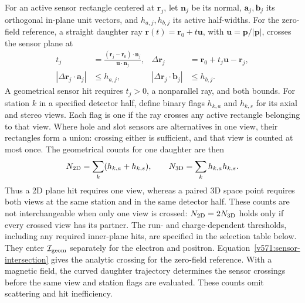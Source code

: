 For an active sensor rectangle centered at $\boldsymbol r_j$, let
$\boldsymbol n_j$ be its normal, $\boldsymbol a_j,\boldsymbol b_j$ its
orthogonal in-plane unit vectors, and $h_{a,j},h_{b,j}$ its active half-widths.
For the zero-field reference, a straight daughter ray
$\boldsymbol r(t)=\boldsymbol r_0+t\boldsymbol u$,
with $\boldsymbol u=\boldsymbol p/|\boldsymbol p|$, crosses the sensor plane at
\begin{align}
  t_j&=\frac{(\boldsymbol r_j-\boldsymbol r_0)\cdot\boldsymbol n_j}
                {\boldsymbol u\cdot\boldsymbol n_j},&
  \Delta\boldsymbol r_j&=\boldsymbol r_0+t_j\boldsymbol u-\boldsymbol r_j,
  \nonumber\\
  |\Delta\boldsymbol r_j\cdot\boldsymbol a_j|&\leq h_{a,j},&
  |\Delta\boldsymbol r_j\cdot\boldsymbol b_j|&\leq h_{b,j}.
  \label{v571:sensor-intersection}
\end{align}
A geometrical sensor hit requires $t_j>0$, a nonparallel ray, and both bounds.
For station $k$ in a specified detector half, define binary flags
$h_{k,a}$ and $h_{k,s}$ for its axial and stereo views.  Each flag is one if
the ray crosses any active rectangle belonging to that view.  Where hole and
slot sensors are alternatives in one view, their rectangles form a union:
crossing either is sufficient, and that view is counted at most once.
The geometrical counts for one daughter are then
\begin{equation}
  N_{\rm 2D}=\sum_k(h_{k,a}+h_{k,s}),\qquad
  N_{\rm 3D}=\sum_k h_{k,a}h_{k,s}.
  \label{v571:hit-counts}
\end{equation}
Thus a 2D plane hit requires one view, whereas a paired 3D space point
requires both views at the same station and in the same detector half.
These counts are not interchangeable when only one view is crossed:
$N_{\rm 2D}=2N_{\rm 3D}$ holds only if every crossed view has its partner.
The run- and charge-dependent thresholds, including any required inner-plane
hits, are specified in the selection table below.  They enter
$\mathcal I_{\rm geom}$ separately for the electron and positron.
Equation~\eqref{v571:sensor-intersection} gives the analytic crossing for the
zero-field reference. With a magnetic field, the curved daughter trajectory
determines the sensor crossings before the same view and station flags are
evaluated. These counts omit scattering and hit inefficiency.

